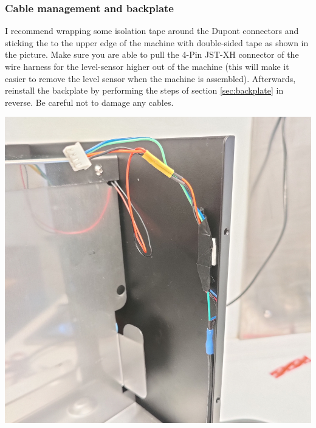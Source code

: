\documentclass[]{article}
\begin{document}
\subsubsection{Cable management and backplate}
\begin{minipage}[t]{0.5\linewidth}
	\vspace{0pt}
	I recommend wrapping some isolation tape around the Dupont connectors and sticking the to the upper edge of the machine with double-sided tape as shown in the picture. Make sure you are able to pull the 4-Pin JST-XH connector of the wire harness for the level-sensor higher out of the machine (this will make it easier to remove the level sensor when the machine is assembled). Afterwards, reinstall the backplate by performing the steps of section \ref{sec:backplate} in reverse. Be careful not to damage any cables.
\end{minipage}
\hfill
\begin{minipage}[t]{0.4\linewidth}
	\vspace{0pt}
	\includegraphics[width=\linewidth]{images/03_installation/20_attach_cables_to_machine.jpg}
\end{minipage}
\end{document}
